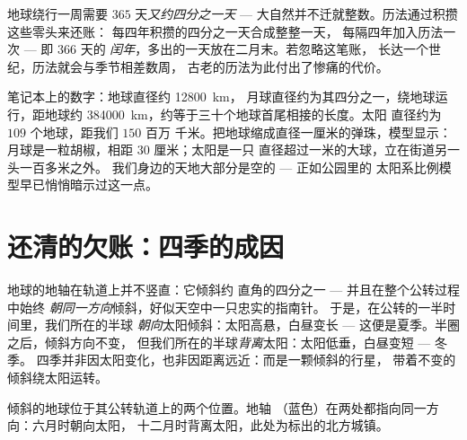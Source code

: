 \begin{example}[四分之一天与闰年]\label{ex:g6:sun-earth-moon:leap}
地球绕行一周需要 $365$ 天\emph{又约四分之一天} ---
大自然并不迁就整数。历法通过积攒这些零头来还账：
每四年积攒的四分之一天合成整整一天，
每隔四年加入历法一次 --- 即 $366$ 天的
\emph{闰年}，多出的一天放在二月末。若忽略这笔账，
长达一个世纪，历法就会与季节相差数周，
古老的历法为此付出了惨痛的代价。
\end{example}

\begin{example}[按比例的系统]\label{ex:g6:sun-earth-moon:scale}
笔记本上的数字：地球直径约 \qty{12800}{km}，
月球直径约为其四分之一，绕地球运行，距地球约
\qty{384000}{km}，约等于三十个地球首尾相接的长度。太阳
直径约为 $109$ 个地球，距我们 $150$ 百万
千米。把地球缩成直径一厘米的弹珠，模型显示：
月球是一粒胡椒，相距 $30$ 厘米；太阳是一只
直径超过一米的大球，立在街道另一头一百多米之外。
我们身边的天地大部分是空的 --- 正如公园里的
太阳系比例模型早已悄悄暗示过这一点。
\end{example}

\section{还清的欠账：四季的成因}

\begin{proposition}[倾斜造成四季]\label{prop:g6:sun-earth-moon:tilt}
地球的地轴在轨道上并不竖直：它倾斜约
直角的四分之一 --- 并且在整个公转过程中始终
\emph{朝同一方向}倾斜，好似天空中一只忠实的指南针。
于是，在公转的一半时间里，我们所在的半球
\emph{朝向}太阳倾斜：太阳高悬，白昼变长 ---
这便是夏季。半圈之后，倾斜方向不变，
但我们所在的半球\emph{背离}太阳：太阳低垂，白昼变短 --- 冬季。
四季并非因太阳变化，也非因距离远近：而是一颗倾斜的行星，
带着不变的倾斜绕太阳运转。
\end{proposition}

\begin{omfigure}

{\small 倾斜的地球位于其公转轨道上的两个位置。地轴
（蓝色）在两处都指向同一方向：六月时朝向太阳，
十二月时背离太阳，此处为标出的北方城镇。}
\end{omfigure}

